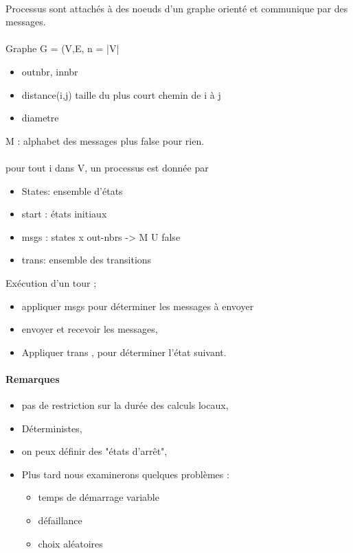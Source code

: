 \documentclass{article}
\begin{document}
\paragraph{}Processus sont attachés à des noeuds d'un graphe orienté  et communique par des messages.\\\\Graphe G  = (V,E, n = |V|
\begin{itemize}
\item outnbr, innbr
\item distance(i,j) taille du plus court chemin de i à j
\item diametre
\end{itemize}
M : alphabet des messages plus false pour rien.\\\\ pour tout i dans V, un processus est donnée par
\begin{itemize}
\item States: ensemble d'états
\item start : états initiaux
\item msgs : states x out-nbrs -> M U {false}
\item trans: ensemble des transitions
\end{itemize}
Exécution d'un tour ; 
\begin{itemize}
\item appliquer msgs pour déterminer les messages à envoyer
\item envoyer et recevoir les messages, 
\item Appliquer trans , pour déterminer l'état suivant.
\end{itemize}

\paragraph{Remarques}
\begin{itemize}
\item pas de restriction sur la durée des calculs locaux,
\item Déterministes,
\item on peux définir des "états d’arrêt",
\item Plus tard nous examinerons quelques problèmes : 
\begin{itemize}
\item temps de démarrage variable
\item défaillance
\item choix aléatoires
\end{itemize}
\end{itemize}
\end{document}
